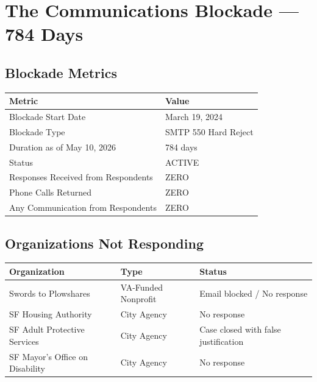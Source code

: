 \documentclass[12pt,letterpaper]{article}
\begin{document}
\newpage

\section{The Communications Blockade --- 784 Days}

\subsection{Blockade Metrics}

\begin{center}
\begin{tabular}{ll}
\toprule
\textbf{Metric} & \textbf{Value} \\
\midrule
Blockade Start Date & March 19, 2024 \\
Blockade Type & SMTP 550 Hard Reject \\
Duration as of May 10, 2026 & 784 days \\
Status & ACTIVE \\
Responses Received from Respondents & ZERO \\
Phone Calls Returned & ZERO \\
Any Communication from Respondents & ZERO \\
\bottomrule
\end{tabular}
\end{center}

\subsection{Organizations Not Responding}

\begin{center}
\begin{tabular}{lll}
\toprule
\textbf{Organization} & \textbf{Type} & \textbf{Status} \\
\midrule
Swords to Plowshares & VA-Funded Nonprofit & Email blocked / No response \\
SF Housing Authority & City Agency & No response \\
SF Adult Protective Services & City Agency & Case closed with false justification \\
SF Mayor's Office on Disability & City Agency & No response \\
\bottomrule
\end{tabular}
\end{center}
\end{document}
